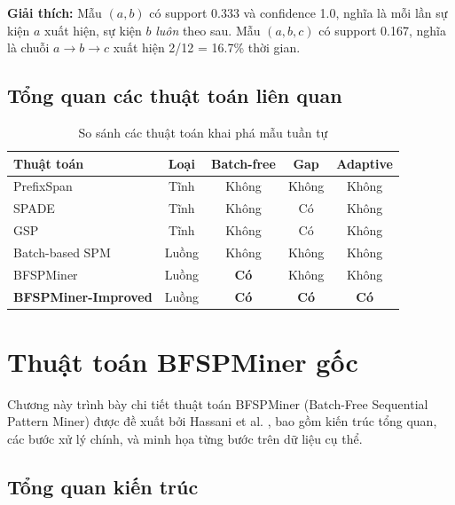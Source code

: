 \documentclass[14pt,a4paper,oneside]{extreport}
\begin{document}
\textbf{Giải thích:} Mẫu $(a, b)$ có support 0.333 và confidence 1.0, nghĩa là mỗi lần sự kiện $a$ xuất hiện, sự kiện $b$ \textit{luôn} theo sau. Mẫu $(a, b, c)$ có support 0.167, nghĩa là chuỗi $a \rightarrow b \rightarrow c$ xuất hiện 2/12 = 16.7\% thời gian.

\section{Tổng quan các thuật toán liên quan}

\begin{table}[H]
    \centering
    \caption{So sánh các thuật toán khai phá mẫu tuần tự}
    \label{tab:related}
    \begin{tabular}{lcccc}
        \toprule
        \textbf{Thuật toán} & \textbf{Loại} & \textbf{Batch-free} & \textbf{Gap} & \textbf{Adaptive} \\
        \midrule
        PrefixSpan \cite{pei2001}  & Tĩnh    & Không & Không & Không \\
        SPADE \cite{zaki2001}      & Tĩnh    & Không & Có    & Không \\
        GSP \cite{srikant1996}     & Tĩnh    & Không & Có    & Không \\
        Batch-based SPM            & Luồng   & Không & Không & Không \\
        BFSPMiner \cite{hassani2019} & Luồng & \textbf{Có} & Không & Không \\
        \textbf{BFSPMiner-Improved} & Luồng & \textbf{Có} & \textbf{Có} & \textbf{Có} \\
        \bottomrule
    \end{tabular}
\end{table}

\chapter{Thuật toán BFSPMiner gốc}
\label{chap:algorithm}

Chương này trình bày chi tiết thuật toán BFSPMiner (Batch-Free Sequential Pattern Miner) được đề xuất bởi Hassani et al. \cite{hassani2019}, bao gồm kiến trúc tổng quan, các bước xử lý chính, và minh họa từng bước trên dữ liệu cụ thể.

\section{Tổng quan kiến trúc}
\end{document}

